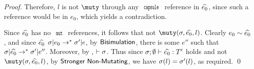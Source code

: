 \begin{proof}
	Therefore, $l$ is not $\muty$ through any $\Kw{capsule}$ reference
	in $\widehat{e_0}$, since such a reference would be in $e_0$, which yields a contradiction.
	
	
	Since $\widehat{e_0}$ has no $\Kw{mut}$ references, it follows that
	not $\muty(\s,\demut{e_0},l)$.
	Clearly $e_0\sim\widehat{e_0}$, and since $\widehat{e_0}$ $\sigma|e_0\rightarrow^*\sigma'|e$,
	by $\textsf{Bisimulation}$, there is some $e''$ such that $\sigma|\widehat{e_0}\rightarrow^*\sigma'|e''$.
	Moreover, by , $\vdash \sigma$. Thus since $\tyr{\demut{e_0}}{T'}$ holds and not $\muty(\s,\demut{e_0},l)$,
	by $\textsf{Stronger Non-Mutating}$, we have $\sigma(l) = \sigma'(l)$, as
	required.
\qed\end{proof}

\lstset{language=FortyThree} %
